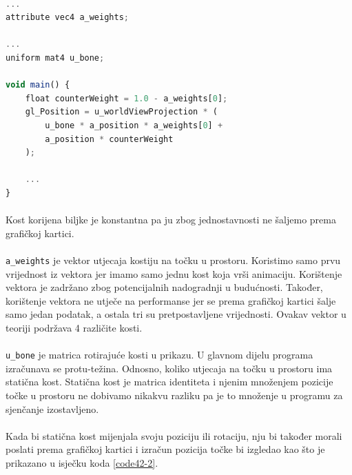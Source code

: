 \documentclass[times, utf8, diplomski]{fer}
\begin{document}
\paragraph{}
\begin{lstlisting}[language=Javascript,label=code42-1,caption=Proširenja programa za sjenčanje omatanjem]
...
attribute vec4 a_weights;

...
uniform mat4 u_bone;

void main() {
	float counterWeight = 1.0 - a_weights[0];
	gl_Position = u_worldViewProjection * (
		u_bone * a_position * a_weights[0] +
		a_position * counterWeight
	);
	
	...
}
\end{lstlisting}

\paragraph{}
Kost korijena biljke je konstantna pa ju zbog jednostavnosti ne šaljemo prema grafičkoj 
kartici. 

\paragraph{}
\verb#a_weights# je vektor utjecaja kostiju na točku u prostoru. Koristimo samo prvu 
vrijednost iz vektora jer imamo samo jednu kost koja vrši animaciju. Korištenje vektora je 
zadržano zbog potencijalnih nadogradnji u budućnosti. Također, korištenje vektora ne utječe 
na performanse jer se prema grafičkoj kartici šalje samo jedan podatak, a ostala tri su 
pretpostavljene vrijednosti. Ovakav vektor u teoriji podržava 4 različite kosti.

\paragraph{}
\verb#u_bone# je matrica rotirajuće kosti u prikazu. U glavnom dijelu programa izračunava se 
protu-težina. Odnosno, koliko utjecaja na točku u prostoru ima statična kost. Statična kost 
je matrica identiteta i njenim množenjem pozicije točke u prostoru ne dobivamo nikakvu 
razliku pa je to množenje u programu za sjenčanje izostavljeno.

\paragraph{}
Kada bi statična kost mijenjala svoju poziciju ili rotaciju, nju bi također morali poslati 
prema grafičkoj kartici i izračun pozicija točke bi izgledao kao što je prikazano u isječku 
koda \ref{code42-2}.
\end{document}
